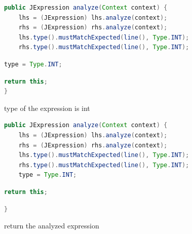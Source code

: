 \documentclass[8pt,a4paper,compress]{beamer}
\begin{document}
\begin{frame}[fragile]
\begin{overprint}
\begin{tcolorbox}[enhanced,drop shadow southwest,sharp corners,size=fbox,colback=white,fontlower=\small\ttfamily,collower=silver900]
\begin{lstlisting}[language=Java,style=focusout]
public JExpression analyze(Context context) {
    lhs = (JExpression) lhs.analyze(context);
    rhs = (JExpression) rhs.analyze(context);
    lhs.type().mustMatchExpected(line(), Type.INT);
    rhs.type().mustMatchExpected(line(), Type.INT);
\end{lstlisting}
\begin{lstlisting}[language=Java,style=focusin,backgroundcolor=\color{lime100}]
    type = Type.INT;
\end{lstlisting}
\begin{lstlisting}[language=Java,style=focusout]
    return this;
}
\end{lstlisting}

\tcblower
\begin{minipage}[t][.25cm][t]{\textwidth}
type of the expression is int
\end{minipage}
\end{tcolorbox}

\begin{tcolorbox}[enhanced,drop shadow southwest,sharp corners,size=fbox,colback=white,fontlower=\small\ttfamily,collower=silver900]
\begin{lstlisting}[language=Java,style=focusout]
public JExpression analyze(Context context) {
    lhs = (JExpression) lhs.analyze(context);
    rhs = (JExpression) rhs.analyze(context);
    lhs.type().mustMatchExpected(line(), Type.INT);
    rhs.type().mustMatchExpected(line(), Type.INT);
    type = Type.INT;
\end{lstlisting}
\begin{lstlisting}[language=Java,style=focusin,backgroundcolor=\color{lime100}]
    return this;
\end{lstlisting}
\begin{lstlisting}[language=Java,style=focusout]
}
\end{lstlisting}

\tcblower
\begin{minipage}[t][.25cm][t]{\textwidth}
return the analyzed expression
\end{minipage}
\end{tcolorbox}

\end{overprint}
\end{frame}
\end{document}
